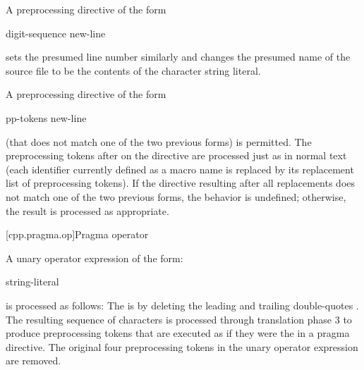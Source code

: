 \documentclass{wg21}
\begin{document}
\pnum
A preprocessing directive of the form

\begin{ncsimplebnf}
     digit-sequence    new-line
\end{ncsimplebnf}

sets the presumed line number similarly and changes the
presumed name of the source file to be the contents
of the character string literal.

\pnum
A preprocessing directive of the form

\begin{ncsimplebnf}
     pp-tokens new-line
\end{ncsimplebnf}

(that does not match one of the two previous forms)
is permitted.
The preprocessing tokens after
on the directive are processed just as in normal text
(each identifier currently defined as a macro name is replaced by its
replacement list of preprocessing tokens).
If the directive resulting after all replacements does not match
one of the two previous forms, the behavior is undefined;
otherwise, the result is processed as appropriate.

[cpp.pragma.op]{Pragma operator}%
%

\pnum
A unary operator expression of the form:

\begin{ncbnf}
     \terminal{(} string-literal \terminal{)}
\end{ncbnf}

is processed as follows: The  is  by
 deleting the leading and trailing
double-quotes . The resulting sequence of characters is processed through translation phase 3
to produce preprocessing tokens that are executed as if they were the
 in a pragma directive. The original four preprocessing
tokens in the unary operator expression are removed.
\end{document}
